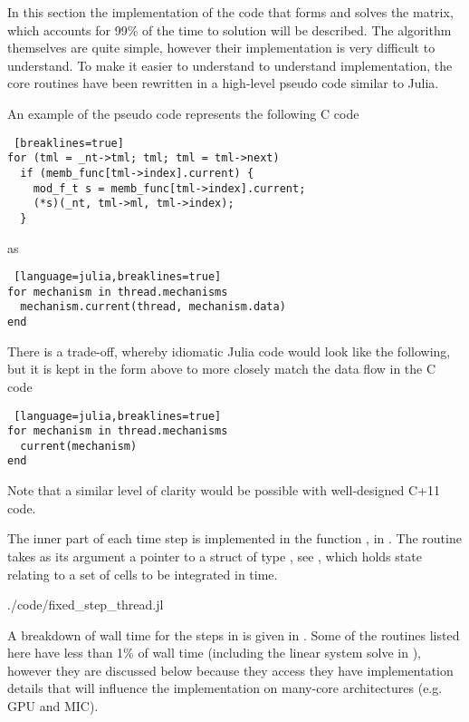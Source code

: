 In this section the implementation of the code that forms and solves the matrix, which accounts for 99\% of the time to solution will be described. The algorithm themselves are quite simple, however their implementation is very difficult to understand. To make it easier to understand to understand implementation, the core routines have been rewritten in a high-level pseudo code similar to Julia.

An example of the pseudo code represents the following C code
\begin{shaded}
\begin{lstlisting} [breaklines=true]
for (tml = _nt->tml; tml; tml = tml->next)
  if (memb_func[tml->index].current) {
    mod_f_t s = memb_func[tml->index].current;
    (*s)(_nt, tml->ml, tml->index);
  }
\end{lstlisting}
\end{shaded}
\noindent as
\begin{shaded}
\begin{lstlisting} [language=julia,breaklines=true]
for mechanism in thread.mechanisms
  mechanism.current(thread, mechanism.data)
end
\end{lstlisting}
\end{shaded}
\noindent There is a trade-off, whereby idiomatic Julia code would look like the following, but it is kept in the form above to more closely match the data flow in the C code
\begin{shaded}
\begin{lstlisting} [language=julia,breaklines=true]
for mechanism in thread.mechanisms
  current(mechanism)
end
\end{lstlisting}
\end{shaded}
\noindent Note that a similar level of clarity would be possible with well-designed C+11 code.

The inner part of each time step is implemented in the function , in . The routine takes as its argument a pointer to a struct of type , see , which holds state relating to a set of cells to be integrated in time.
\begin{shaded}
 {./code/fixed_step_thread.jl}
\end{shaded}

A breakdown of wall time for the steps in  is given in . Some of the routines listed here have less than 1\% of wall time (including the linear system solve in ), however they are discussed below because they access they have implementation details that will influence the implementation on many-core architectures (e.g. GPU and MIC).

